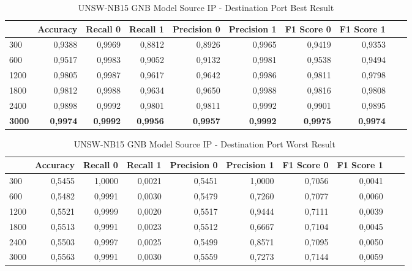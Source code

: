 \documentclass{article}
\begin{document}
\begin{table}
  \centering
  \caption{UNSW-NB15 GNB Model Source IP - Destination Port Best Result}
  \label{unswnb15-gnb-src-ip-dst-port-best}
  \begin{tabular}{lrrrrrrrrr}
    \toprule
	{ Pred Win & Accuracy & Recall 0 & Recall 1 & Precision 0 & Precision 1 & F1 Score 0 & F1 Score 1} \\
	\midrule
        300 & 0,9388 & 0,9969 & 0,8812 & 0,8926 & 0,9965 & 0,9419 & 0,9353 \\ \hline
        600 & 0,9517 & 0,9983 & 0,9052 & 0,9132 & 0,9981 & 0,9538 & 0,9494 \\ \hline
        1200 & 0,9805 & 0,9987 & 0,9617 & 0,9642 & 0,9986 & 0,9811 & 0,9798 \\ \hline
        1800 & 0,9812 & 0,9988 & 0,9634 & 0,9650 & 0,9988 & 0,9816 & 0,9808 \\ \hline
        2400 & 0,9898 & 0,9992 & 0,9801 & 0,9811 & 0,9992 & 0,9901 & 0,9895 \\ \hline
        \textbf{3000} & \textbf{0,9974} & \textbf{0,9992} & \textbf{0,9956} & \textbf{0,9957} & \textbf{0,9992} & \textbf{0,9975} & \textbf{0,9974} \\ 
	\bottomrule
  \end{tabular}
\end{table}

\begin{table}
  \centering
  \caption{UNSW-NB15 GNB Model Source IP - Destination Port Worst Result}
  \label{unswnb15-gnb-src-ip-dst-port-worst}
  \begin{tabular}{lrrrrrrrrr}
    \toprule
	{ Pred Win & Accuracy & Recall 0 & Recall 1 & Precision 0 & Precision 1 & F1 Score 0 & F1 Score 1} \\
	\midrule
        300 & 0,5455 & 1,0000 & 0,0021 & 0,5451 & 1,0000 & 0,7056 & 0,0041 \\ \hline
        600 & 0,5482 & 0,9991 & 0,0030 & 0,5479 & 0,7260 & 0,7077 & 0,0060 \\ \hline
        1200 & 0,5521 & 0,9999 & 0,0020 & 0,5517 & 0,9444 & 0,7111 & 0,0039 \\ \hline
        1800 & 0,5513 & 0,9991 & 0,0023 & 0,5512 & 0,6667 & 0,7104 & 0,0045 \\ \hline
        2400 & 0,5503 & 0,9997 & 0,0025 & 0,5499 & 0,8571 & 0,7095 & 0,0050 \\ \hline
        3000 & 0,5563 & 0,9991 & 0,0030 & 0,5559 & 0,7273 & 0,7144 & 0,0059 \\ 
	\bottomrule
  \end{tabular}
\end{table}
\end{document}
